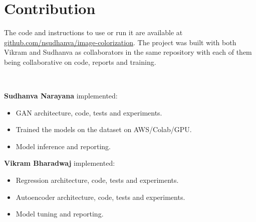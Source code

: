 \documentclass{article}
\begin{document}
\section{Contribution}

The code and instructions to use or run it are available 
at \url{github.com/nsudhanva/image-colorization}. 
The project was built with both Vikram and Sudhanva as collaborators in the same repository with each of them being collaborative on code, reports and training.

\

\textbf{Sudhanva Narayana} implemented:
\begin{itemize}
\item GAN architecture, code, tests and experiments.
\item Trained the models on the dataset on AWS/Colab/GPU.
\item Model inference and reporting.
\end{itemize}



\textbf{Vikram Bharadwaj} implemented:
\begin{itemize}
\item Regression architecture, code, tests and experiments.
\item Autoencoder architecture, code, tests and experiments.
\item Model tuning and reporting.
\end{itemize}

\cite{1}
\cite{2}
\cite{4}
\cite{5}
\cite{6}
\cite{7}
\cite{8}


\end{document}
